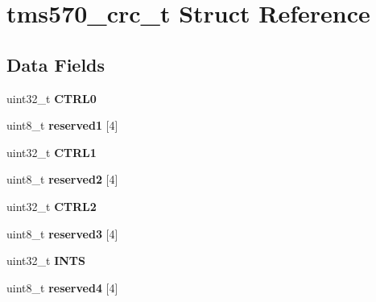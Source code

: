 \hypertarget{structtms570__crc__t}{}\section{tms570\+\_\+crc\+\_\+t Struct Reference}
\label{structtms570__crc__t}
\subsection*{Data Fields}
\begin{DoxyCompactItemize}
\item 
\mbox{\label{structtms570__crc__t_a57e44ded3498a11ac02c40b1be52d6ed}} 
uint32\+\_\+t {\bfseries C\+T\+R\+L0}
\item 
\mbox{\label{structtms570__crc__t_ac9a3945a36a7107186e917d5b97b8b4e}} 
uint8\+\_\+t {\bfseries reserved1} \mbox{[}4\mbox{]}
\item 
\mbox{\label{structtms570__crc__t_add35893003f4bb784b2398c10c9ac752}} 
uint32\+\_\+t {\bfseries C\+T\+R\+L1}
\item 
\mbox{\label{structtms570__crc__t_a2eccbbfa01a3414870a9ac4f8a3e318a}} 
uint8\+\_\+t {\bfseries reserved2} \mbox{[}4\mbox{]}
\item 
\mbox{\label{structtms570__crc__t_a9d5d95a153031c08bb1dfdf5fa4e0d42}} 
uint32\+\_\+t {\bfseries C\+T\+R\+L2}
\item 
\mbox{\label{structtms570__crc__t_a85878a565735f8125dc2155946067b38}} 
uint8\+\_\+t {\bfseries reserved3} \mbox{[}4\mbox{]}
\item 
\mbox{\label{structtms570__crc__t_a150a8742359fc142f8c8a8c4de99e19c}} 
uint32\+\_\+t {\bfseries I\+N\+TS}
\item 
\mbox{\label{structtms570__crc__t_a7449b2f05079f8d5435ff2441d17e484}} 
uint8\+\_\+t {\bfseries reserved4} \mbox{[}4\mbox{]}
\item 
\mbox{\label{structtms570__crc__t_aae78bb4e33a351920af36de52c24b99a}} 

\end{DoxyCompactItemize}
